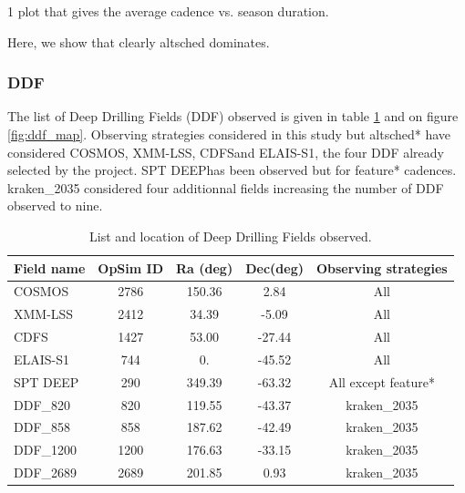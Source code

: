 \documentclass [11pt,a4paper]{article}
\newcommand{\cosmos}{COSMOS}
\newcommand{\xmmlss}{XMM-LSS}
\newcommand{\cdfs}{CDFS}
\newcommand{\elais}{ELAIS-S1}
\newcommand{\spt}{SPT DEEP}
\newcommand{\ddfa}{DDF\_820}
\newcommand{\ddfb}{DDF\_858}
\newcommand{\ddfc}{DDF\_1200}
\newcommand{\ddfd}{DDF\_2689}
\begin{document}
1 plot that gives the average cadence vs. season duration. 

Here, we show that clearly altsched dominates. 



\subsubsection{ DDF}

The list of Deep Drilling Fields (DDF) observed is given in table \ref{tab:ddf_list} and on figure \ref{fig:ddf_map}. Observing strategies considered in this study but altsched* have considered \cosmos, \xmmlss, \cdfs and \elais, the four DDF already selected by the project. \spt has been observed but for feature* cadences. kraken\_2035 considered four additionnal fields increasing the number of DDF observed to nine.

\begin{table}[!htbp]
  \begin{center}
  \begin{tabular}{|l|c|c|c|c|}
    \hline
    Field name & OpSim ID & Ra (deg) & Dec(deg) & Observing strategies\\
    \hline
    \cosmos & 2786 & 150.36 & 2.84 &All \\
    \xmmlss & 2412 & 34.39 & -5.09 & All \\
    \cdfs & 1427 & 53.00 & -27.44 & All \\
    \elais & 744 & 0.  & -45.52 & All \\
    \spt & 290 & 349.39 & -63.32 & All except feature*\\
    \ddfa & 820 & 119.55 & -43.37 & kraken\_2035\\
    \ddfb & 858 & 187.62 & -42.49 & kraken\_2035\\
    \ddfc & 1200 & 176.63 & -33.15 & kraken\_2035\\
    \ddfd & 2689 & 201.85 & 0.93 & kraken\_2035\\
    \hline
  \end{tabular}
  \caption{List and location of Deep Drilling Fields observed.}\label{tab:ddf_list}
  \end{center}
\end{table}
\end{document}

